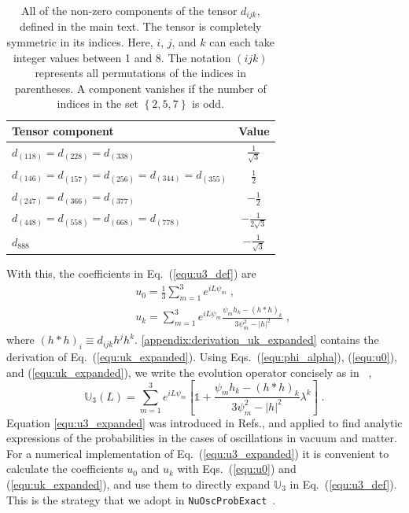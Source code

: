 \documentclass[final,5p,times,twocolumn]{elsarticle}
\newcommand{\eq}{Eq.}
\providecommand{\Ref}{} %
\newcommand{\Refs}{Refs.}
\newcommand{\equ}[1]{\eq~(\ref{equ:#1})}
\begin{document}
{\def\arraystretch{1.2}
\begin{table}[t!]
  \begin{tabular}{lc}
   Tensor component & Value \\
   \hline
   $d_{(118)} = d_{(228)} = d_{(338)}$                         & $\frac{1}{\sqrt{3}}$ \\
   $d_{(146)} = d_{(157)} = d_{(256)} = d_{(344)} = d_{(355)}$ & $\frac{1}{2}$ \\
   $d_{(247)} = d_{(366)} = d_{(377)}$                         & $-\frac{1}{2}$ \\
   $d_{(448)} = d_{(558)} = d_{(668)} = d_{(778)}$             & $-\frac{1}{2\sqrt{3}}$ \\
   $d_{888}$                                                   & $-\frac{1}{\sqrt{3}}$
  \end{tabular}
  \caption{\label{tab:d_tensor}All of the non-zero components of the tensor $d_{ijk}$, defined in the main text.  The tensor is completely symmetric in its indices.  Here, $i$, $j$, and $k$ can each take integer values between 1 and 8.  The notation $\left( ijk \right)$ represents all permutations of the indices in parentheses.  A component vanishes if the number of indices in the set $\left\{ 2,5,7 \right\}$ is odd.}
\end{table}
}

With this, the coefficients in \equ{u3_def} are
\begin{eqnarray}
 && \label{equ:u0}
 u_0=\frac{1}{3}\sum_{m=1}^3 e^{i L \psi_m} \;, \\
 \label{equ:uk_expanded}
 && u_k
 =
 \sum_{m=1}^3
 e^{i L \psi_m} \frac{\psi_m h_k - \left(h \ast h\right)_k}{3\psi_m^2 - \left\vert h \right\vert^2} \;,
\end{eqnarray}
where $\left(h\ast h\right)_i \equiv d_{ijk}h^jh^k$.  \ref{appendix:derivation_uk_expanded} contains the derivation of \equ{uk_expanded}.  Using Eqs.\ (\ref{equ:phi_alpha}), (\ref{equ:u0}), and (\ref{equ:uk_expanded}), we write the evolution operator concisely as in \Ref\ \cite{Ohlsson:1999xb},
\begin{equation}
 \label{equ:u3_expanded}
 \mathbb{U}_3(L)
 =
 \sum_{m=1}^3
 e^{i L \psi_m}
 \left[
 \mathbb{1} 
 +
 \frac{\psi_m h_k - \left( h \ast h \right)_k}{3\psi_m^2-\lvert h \rvert^2} \lambda^k
 \right] \;.
\end{equation}
Equation \ref{equ:u3_expanded} was introduced in \Refs \cite{Ohlsson:1999xb, Ohlsson:1999um, Ohlsson:2000zz}, and applied to find analytic expressions of the probabilities in the cases of oscillations in vacuum and matter.  For a numerical implementation of \equ{u3_expanded} it is convenient to calculate the coefficients $u_0$ and $u_k$ with Eqs.\ (\ref{equ:u0}) and (\ref{equ:uk_expanded}), and use them to directly expand $\mathbb{U}_3$ in \equ{u3_def}.  This is the strategy that we adopt in {\tt NuOscProbExact}\ \cite{NuOscProbExact}.  
\end{document}
